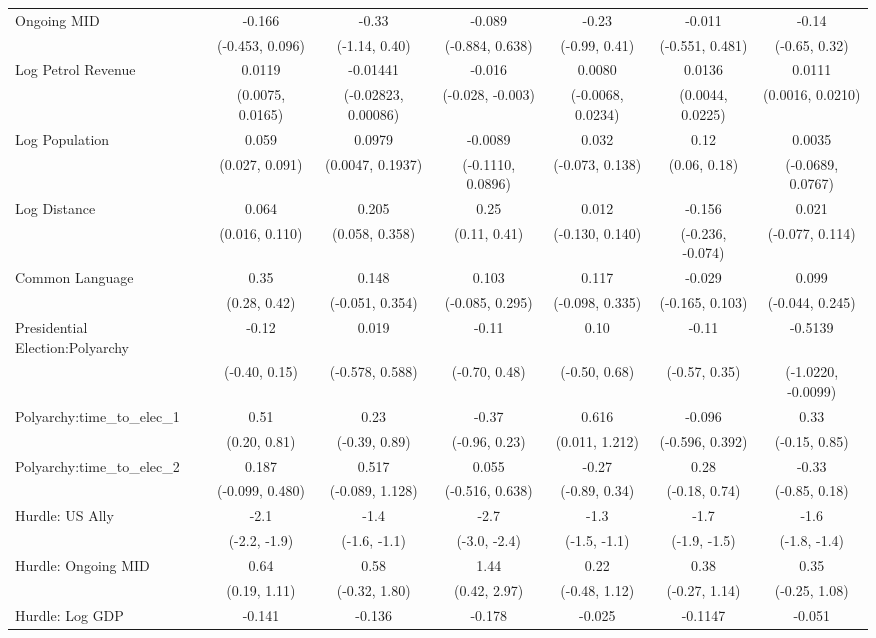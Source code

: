 \begin{table}[H]
\begin{tabular}[t]{lcccccc}
Ongoing MID & -0.166 & -0.33 & -0.089 & -0.23 & -0.011 & -0.14\\
 & (-0.453, 0.096) & (-1.14, 0.40) & (-0.884, 0.638) & (-0.99, 0.41) & (-0.551, 0.481) & (-0.65, 0.32)\\
Log Petrol Revenue & 0.0119 & -0.01441 & -0.016 & 0.0080 & 0.0136 & 0.0111\\
 & (0.0075, 0.0165) & (-0.02823, 0.00086) & (-0.028, -0.003) & (-0.0068, 0.0234) & (0.0044, 0.0225) & (0.0016, 0.0210)\\
Log Population & 0.059 & 0.0979 & -0.0089 & 0.032 & 0.12 & 0.0035\\
 & (0.027, 0.091) & (0.0047, 0.1937) & (-0.1110, 0.0896) & (-0.073, 0.138) & (0.06, 0.18) & (-0.0689, 0.0767)\\
Log Distance & 0.064 & 0.205 & 0.25 & 0.012 & -0.156 & 0.021\\
 & (0.016, 0.110) & (0.058, 0.358) & (0.11, 0.41) & (-0.130, 0.140) & (-0.236, -0.074) & (-0.077, 0.114)\\
Common Language & 0.35 & 0.148 & 0.103 & 0.117 & -0.029 & 0.099\\
 & (0.28, 0.42) & (-0.051, 0.354) & (-0.085, 0.295) & (-0.098, 0.335) & (-0.165, 0.103) & (-0.044, 0.245)\\
Presidential Election:Polyarchy & -0.12 & 0.019 & -0.11 & 0.10 & -0.11 & -0.5139\\
 & (-0.40, 0.15) & (-0.578, 0.588) & (-0.70, 0.48) & (-0.50, 0.68) & (-0.57, 0.35) & (-1.0220, -0.0099)\\
Polyarchy:time\_to\_elec\_1 & 0.51 & 0.23 & -0.37 & 0.616 & -0.096 & 0.33\\
 & (0.20, 0.81) & (-0.39, 0.89) & (-0.96, 0.23) & (0.011, 1.212) & (-0.596, 0.392) & (-0.15, 0.85)\\
Polyarchy:time\_to\_elec\_2 & 0.187 & 0.517 & 0.055 & -0.27 & 0.28 & -0.33\\
 & (-0.099, 0.480) & (-0.089, 1.128) & (-0.516, 0.638) & (-0.89, 0.34) & (-0.18, 0.74) & (-0.85, 0.18)\\
Hurdle: US Ally & -2.1 & -1.4 & -2.7 & -1.3 & -1.7 & -1.6\\
 & (-2.2, -1.9) & (-1.6, -1.1) & (-3.0, -2.4) & (-1.5, -1.1) & (-1.9, -1.5) & (-1.8, -1.4)\\
Hurdle: Ongoing MID & 0.64 & 0.58 & 1.44 & 0.22 & 0.38 & 0.35\\
 & (0.19, 1.11) & (-0.32, 1.80) & (0.42, 2.97) & (-0.48, 1.12) & (-0.27, 1.14) & (-0.25, 1.08)\\
Hurdle: Log GDP & -0.141 & -0.136 & -0.178 & -0.025 & -0.1147 & -0.051\\

\end{tabular}
\end{table}
